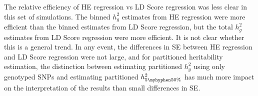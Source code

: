 The relative efficiency of HE regression vs LD Score regression was less clear in this set of simulations. 
The binned $h^2_g$ estimates from HE regression were more efficient than the binned estimates from
LD Score regression, but the total $h^2_g$ estimates from LD Score regression were more efficient. 
It is not clear whether this is a general trend.
In any event, the differences in SE between HE regression and LD Score regression were not large, and
for partitioned heritability estimation, the distinction between estimating partitioned $h^2_g$ using only genotyped SNPs and 
estimating partitioned $h^2_{5\myhyphen50\%}$ has much more impact on the interpretation of the results
than small differences in SE.

